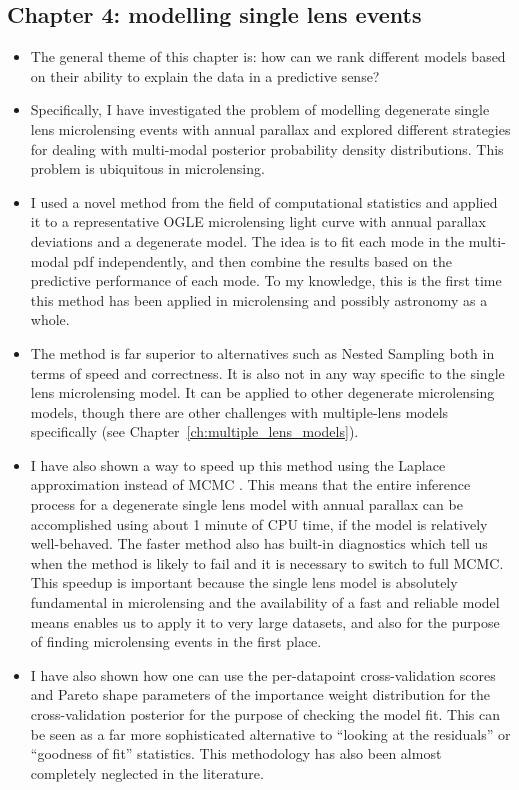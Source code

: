 \documentclass[12pt,dvipsnames]{report}
\begin{document}
\subsection{Chapter 4: modelling single lens events}
\begin{itemize}
    \item The general theme of this chapter is: how can we rank different models based on their 
    ability to explain the data in a predictive sense?
    \item Specifically, I have investigated the problem of modelling degenerate single lens microlensing 
    events with annual parallax and explored different strategies for dealing with multi-modal 
    posterior probability density distributions. This problem is ubiquitous in microlensing.
    \item I used a novel method from the field of computational statistics 
    \citep{arXiv:2006.12335} and applied it to a representative OGLE microlensing light curve with 
    annual parallax deviations and a degenerate model. The idea is to fit each mode in 
    the multi-modal pdf independently, and then combine the results based on the predictive 
    performance of each mode. To my knowledge, this is the first time this method has been applied
    in microlensing and possibly astronomy as a whole.
    \item The method is far superior to alternatives such as Nested Sampling both in 
    terms of speed and correctness. It is also not in any way specific to the single lens
    microlensing model. It can be applied to other degenerate microlensing models, 
    though there are other challenges with multiple-lens models specifically (see 
    Chapter~\ref{ch:multiple_lens_models}).
    \item I have also shown a way to speed up this method using the Laplace approximation
    instead of MCMC \citep[see][]{pmlr-v97-magnusson19a}. This means that the entire inference 
    process for a degenerate single lens model with annual parallax can be accomplished using about 
    1 minute of CPU time, if the model is relatively well-behaved. The faster method also 
    has built-in diagnostics which tell us when the method is likely to fail and it is necessary 
    to switch to full MCMC. This speedup is important because the single lens model is 
    absolutely fundamental in microlensing and the availability of a fast and reliable model means enables
    us to apply it to very large datasets, and also for the purpose of finding microlensing events 
    in the first place.
    \item I have also shown how one can use the per-datapoint cross-validation scores 
    and Pareto shape parameters of the importance weight distribution for the cross-validation
    posterior for the purpose of checking the model fit.
     This can be seen as a far more sophisticated alternative to 
    ``looking at the residuals'' or ``goodness of fit'' statistics. This methodology has also
    been almost completely neglected in the literature.
\end{itemize}
\end{document}
